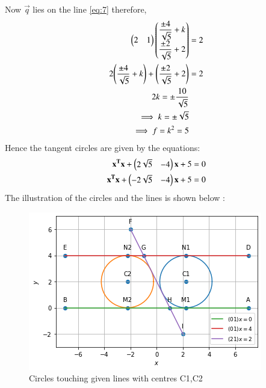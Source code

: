 \documentclass[journal,12pt,twocolumn]{IEEEtran}
\begin{document}
Now $\vec{q}$ lies on the line \eqref{eq:7} therefore,
\begin{align}
\begin{pmatrix}2 & 1\end{pmatrix}\begin{pmatrix}\dfrac{\pm 4}{\sqrt{5}} +k \\\dfrac{\pm 2}{\sqrt{5}} +2\end{pmatrix} &= 2 \\
2\Bigg(\dfrac{\pm 4}{\sqrt{5}} +k\Bigg) + \Bigg(\dfrac{\pm 2}{\sqrt{5}} +2\Bigg) &= 2\\\
2k = \pm \dfrac{10}{\sqrt{5}}\\
\implies k = \pm \sqrt{5} \\
\implies f = k^2 = 5
\end{align}
Hence the tangent circles are given by the equations:
\begin{align}
\mathbf{x^T}\mathbf{x} + \begin{pmatrix}2\sqrt{5} & -4\end{pmatrix}\mathbf{x} + 5 &= 0 \\
\mathbf{x^T}\mathbf{x} + \begin{pmatrix}-2\sqrt{5} & -4\end{pmatrix}\mathbf{x} + 5 &= 0
\end{align}
The illustration of the circles and the lines is shown below :
\begin{figure}[!ht]
       \centering
    \includegraphics[width=\columnwidth] {Assignment_3_Fig_1.png}
    \caption{Circles touching given lines with centres C1,C2}
    \label{Tangent circles to 3 given lines}
\end{figure}
\end{document}
